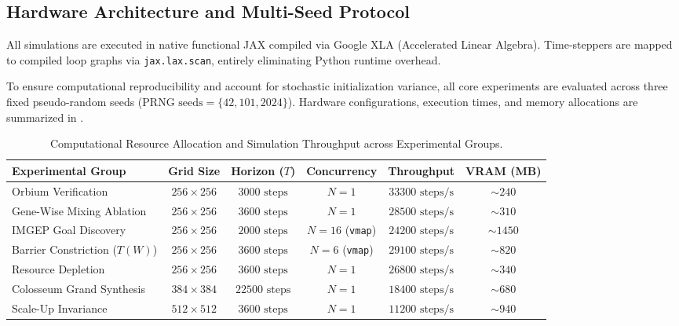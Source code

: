 \subsection{Hardware Architecture and Multi-Seed Protocol}
\label{subsec:exp_hardware_protocol}

All simulations are executed in native functional JAX compiled via Google XLA (Accelerated Linear Algebra). Time-steppers are mapped to compiled loop graphs via \texttt{jax.lax.scan}, entirely eliminating Python runtime overhead.

To ensure computational reproducibility and account for stochastic initialization variance, all core experiments are evaluated across three fixed pseudo-random seeds ($\text{PRNG seeds} = \{42, 101, 2024\}$). Hardware configurations, execution times, and memory allocations are summarized in .

\begin{table}[htbp]
\centering
\footnotesize
\caption{Computational Resource Allocation and Simulation Throughput across Experimental Groups.}
\label{tab:hardware_resource_matrix}
\begin{tabularx}{\textwidth}{X ccccc}
\toprule
\textbf{Experimental Group} & \textbf{Grid Size} & \textbf{Horizon ($T$)} & \textbf{Concurrency} & \textbf{Throughput} & \textbf{VRAM (MB)} \\
\midrule
Orbium Verification & $256 \times 256$ & $3000\text{ steps}$ & $N = 1$ & $33300\text{ steps/s}$ & $\sim 240$ \\
Gene-Wise Mixing Ablation & $256 \times 256$ & $3600\text{ steps}$ & $N = 1$ & $28500\text{ steps/s}$ & $\sim 310$ \\
IMGEP Goal Discovery & $256 \times 256$ & $2000\text{ steps}$ & $N = 16$ (\texttt{vmap}) & $24200\text{ steps/s}$ & $\sim 1450$ \\
Barrier Constriction ($T(W)$) & $256 \times 256$ & $3600\text{ steps}$ & $N = 6$ (\texttt{vmap}) & $29100\text{ steps/s}$ & $\sim 820$ \\
Resource Depletion & $256 \times 256$ & $3600\text{ steps}$ & $N = 1$ & $26800\text{ steps/s}$ & $\sim 340$ \\
Colosseum Grand Synthesis & $384 \times 384$ & $22500\text{ steps}$ & $N = 1$ & $18400\text{ steps/s}$ & $\sim 680$ \\
Scale-Up Invariance & $512 \times 512$ & $3600\text{ steps}$ & $N = 1$ & $11200\text{ steps/s}$ & $\sim 940$ \\
\bottomrule
\end{tabularx}
\end{table}